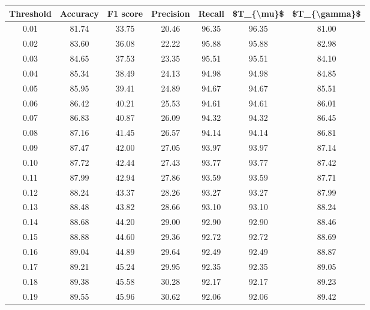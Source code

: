 \begin{tabular}{|c|c|c|c|c|c|c|}
\hline
 Threshold &  Accuracy &  F1 score &  Precision &  Recall &  \$T\_\{\textbackslash mu\}\$ &  \$T\_\{\textbackslash gamma\}\$ \\
\hline
      0.01 &     81.74 &     33.75 &      20.46 &   96.35 &      96.35 &         81.00 \\
      0.02 &     83.60 &     36.08 &      22.22 &   95.88 &      95.88 &         82.98 \\
      0.03 &     84.65 &     37.53 &      23.35 &   95.51 &      95.51 &         84.10 \\
      0.04 &     85.34 &     38.49 &      24.13 &   94.98 &      94.98 &         84.85 \\
      0.05 &     85.95 &     39.41 &      24.89 &   94.67 &      94.67 &         85.51 \\
      0.06 &     86.42 &     40.21 &      25.53 &   94.61 &      94.61 &         86.01 \\
      0.07 &     86.83 &     40.87 &      26.09 &   94.32 &      94.32 &         86.45 \\
      0.08 &     87.16 &     41.45 &      26.57 &   94.14 &      94.14 &         86.81 \\
      0.09 &     87.47 &     42.00 &      27.05 &   93.97 &      93.97 &         87.14 \\
      0.10 &     87.72 &     42.44 &      27.43 &   93.77 &      93.77 &         87.42 \\
      0.11 &     87.99 &     42.94 &      27.86 &   93.59 &      93.59 &         87.71 \\
      0.12 &     88.24 &     43.37 &      28.26 &   93.27 &      93.27 &         87.99 \\
      0.13 &     88.48 &     43.82 &      28.66 &   93.10 &      93.10 &         88.24 \\
      0.14 &     88.68 &     44.20 &      29.00 &   92.90 &      92.90 &         88.46 \\
      0.15 &     88.88 &     44.60 &      29.36 &   92.72 &      92.72 &         88.69 \\
      0.16 &     89.04 &     44.89 &      29.64 &   92.49 &      92.49 &         88.87 \\
      0.17 &     89.21 &     45.24 &      29.95 &   92.35 &      92.35 &         89.05 \\
      0.18 &     89.38 &     45.58 &      30.28 &   92.17 &      92.17 &         89.23 \\
      0.19 &     89.55 &     45.96 &      30.62 &   92.06 &      92.06 &         89.42 \\

\end{tabular}
